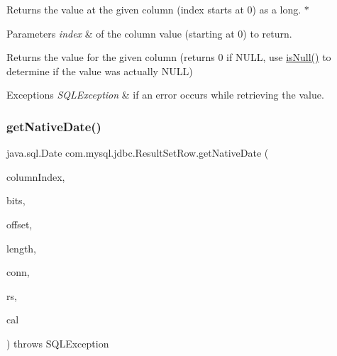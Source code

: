 Returns the value at the given column (index starts at 0) as a long. $\ast$


\begin{DoxyParams}{Parameters}
{\em index} & of the column value (starting at 0) to return. \\
\hline
\end{DoxyParams}
\begin{DoxyReturn}{Returns}
the value for the given column (returns 0 if N\+U\+LL, use \mbox{\hyperlink{classcom_1_1mysql_1_1jdbc_1_1_result_set_row_a96243f8e7eb839c4c233a2e4aa1cfb6b}{is\+Null()}} to determine if the value was actually N\+U\+LL) 
\end{DoxyReturn}

\begin{DoxyExceptions}{Exceptions}
{\em S\+Q\+L\+Exception} & if an error occurs while retrieving the value. \\
\hline
\end{DoxyExceptions}
\mbox{\label{classcom_1_1mysql_1_1jdbc_1_1_result_set_row_a341f6e94b4b79858e732cc6dc8bfc452}} 
\subsubsection{\texorpdfstring{get\+Native\+Date()}{getNativeDate()}}
{\footnotesize\ttfamily java.\+sql.\+Date com.\+mysql.\+jdbc.\+Result\+Set\+Row.\+get\+Native\+Date (\begin{DoxyParamCaption}\item[{int}]{column\+Index,  }\item[{byte \mbox{[}$\,$\mbox{]}}]{bits,  }\item[{int}]{offset,  }\item[{int}]{length,  }\item[{\mbox{\hyperlink{interfacecom_1_1mysql_1_1jdbc_1_1_my_s_q_l_connection}{My\+S\+Q\+L\+Connection}}}]{conn,  }\item[{\mbox{\hyperlink{classcom_1_1mysql_1_1jdbc_1_1_result_set_impl}{Result\+Set\+Impl}}}]{rs,  }\item[{Calendar}]{cal }\end{DoxyParamCaption}) throws S\+Q\+L\+Exception\hspace{0.3cm}{\ttfamily [protected]}}


